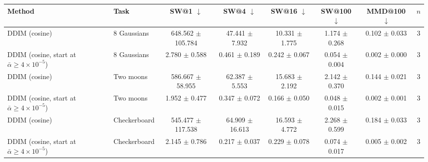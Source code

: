 \begin{tabular}{llcccccc}
\toprule
Method & Task & SW@1 $\downarrow$ & SW@4 $\downarrow$ & SW@16 $\downarrow$ & SW@100 $\downarrow$ & MMD@100 $\downarrow$ & $n$ \\
\midrule
DDIM (cosine) & 8 Gaussians & 648.562 $\pm$ 105.784 & 47.441 $\pm$ 7.932 & 10.331 $\pm$ 1.775 & 1.174 $\pm$ 0.268 & 0.102 $\pm$ 0.033 & 3 \\
DDIM (cosine, start at $\bar\alpha\ge4\times10^{-5}$) & 8 Gaussians & 2.780 $\pm$ 0.588 & 0.461 $\pm$ 0.189 & 0.242 $\pm$ 0.067 & 0.054 $\pm$ 0.004 & 0.002 $\pm$ 0.000 & 3 \\
\midrule
DDIM (cosine) & Two moons & 586.667 $\pm$ 58.955 & 62.387 $\pm$ 5.553 & 15.683 $\pm$ 2.192 & 2.142 $\pm$ 0.370 & 0.144 $\pm$ 0.021 & 3 \\
DDIM (cosine, start at $\bar\alpha\ge4\times10^{-5}$) & Two moons & 1.952 $\pm$ 0.477 & 0.347 $\pm$ 0.072 & 0.166 $\pm$ 0.050 & 0.048 $\pm$ 0.015 & 0.002 $\pm$ 0.001 & 3 \\
\midrule
DDIM (cosine) & Checkerboard & 545.477 $\pm$ 117.538 & 64.909 $\pm$ 16.613 & 16.593 $\pm$ 4.772 & 2.268 $\pm$ 0.599 & 0.184 $\pm$ 0.033 & 3 \\
DDIM (cosine, start at $\bar\alpha\ge4\times10^{-5}$) & Checkerboard & 2.145 $\pm$ 0.786 & 0.217 $\pm$ 0.037 & 0.229 $\pm$ 0.078 & 0.074 $\pm$ 0.017 & 0.005 $\pm$ 0.002 & 3 \\
\bottomrule
\end{tabular}
